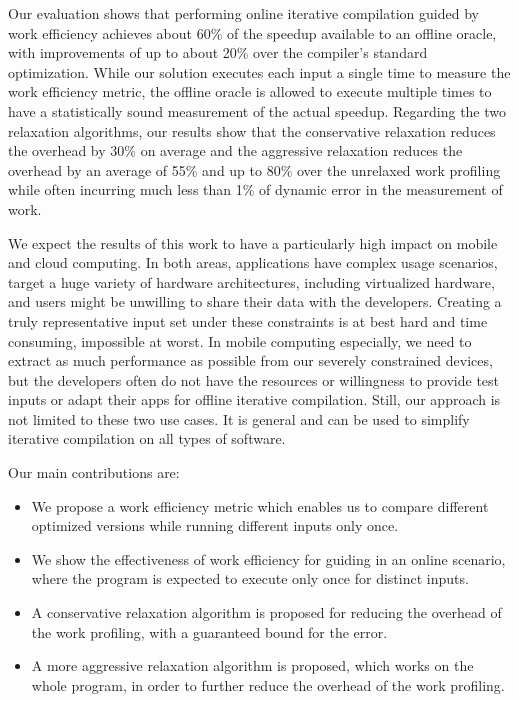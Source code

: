     Our evaluation shows that performing online iterative compilation guided by work efficiency achieves about 60\% of the speedup
    available to an offline oracle, with improvements of up to about 20\% over the compiler's standard optimization. While our solution
    executes each input a single time to measure the work efficiency metric, the offline oracle is allowed to execute multiple times to
    have a statistically sound measurement of the actual speedup. Regarding the two relaxation algorithms, our results show that the
    conservative relaxation reduces the overhead by 30\% on average and the aggressive relaxation reduces the overhead by an average of
    55\% and up to 80\% over the unrelaxed work profiling while often incurring much less than 1\% of dynamic error in the measurement of
    work.

    We expect the results of this work to have a particularly high impact on mobile and cloud computing. In both areas, applications have
    complex usage scenarios, target a huge variety of hardware architectures, including virtualized hardware, and users might be unwilling
    to share their data with the developers. Creating a truly representative input set under these constraints is at best hard and time
    consuming, impossible at worst. In mobile computing especially, we need to extract as much performance as possible from our severely
    constrained devices, but the developers often do not have the resources or willingness to provide test inputs or adapt their apps for
    offline iterative compilation. Still, our approach is not limited to these two use cases. It is general and can be used to simplify
    iterative compilation on all types of software.

    Our main contributions are:

    \begin{itemize}[leftmargin=3mm]

        \item We propose a work efficiency metric which enables us to compare different optimized versions while running different inputs
        only once.

        \item We show the effectiveness of work efficiency for guiding {\itercomp} in an online scenario, where the program is expected
        to execute only once for distinct inputs.

        \item A conservative relaxation algorithm is proposed for reducing the overhead of the work profiling, with a guaranteed bound for
        the error.

        \item A more aggressive relaxation algorithm is proposed, which works on the whole program, in order to further reduce the overhead
        of the work profiling.
    \end{itemize}
